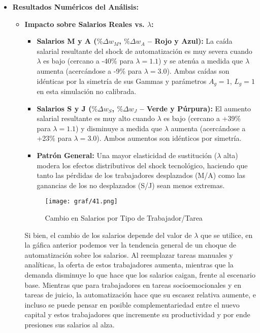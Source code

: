 \documentclass{article}
\theoremstyle{remark}
\theoremstyle{definition}
\begin{document}
\begin{enumerate}
\begin{tcolorbox}[title= Soluci\'on 5]
\begin{itemize}
             \item \textbf{Resultados Numéricos del Análisis:}
                \begin{itemize}
                    \item \textbf{Impacto sobre Salarios Reales vs. \(\lambda\):}                    
                    \begin{itemize}
                        \item \textbf{Salarios M y A ($\%\Delta w_M$, $\%\Delta w_A$ – Rojo y Azul):} La caída salarial resultante del shock de automatizaci\'on es muy severa cuando $\lambda$ es bajo (cercano a -40\% para \(\lambda=1.1\)) y se atenúa a medida que \(\lambda\) aumenta (acercándose a -9\% para \(\lambda=3.0\)). Ambas caídas son idénticas por la simetría de sus Gammas y parámetros \(A_g=1\), \(L_g=1\) en esta simulación no calibrada.
                        \item \textbf{Salarios S y J (\(\%\Delta w_S\), \(\%\Delta w_J\) – Verde y Púrpura):} El aumento salarial resultante es muy alto cuando \(\lambda\) es bajo (cercano a +39\% para \(\lambda=1.1\)) y disminuye a medida que \(\lambda\) aumenta (acercándose a +23\% para \(\lambda=3.0\)). Ambos aumentos son idénticos por simetría.
                        \item \textbf{Patrón General:} Una mayor elasticidad de sustitución (\(\lambda\) alta) modera los efectos distributivos del shock tecnológico, haciendo que tanto las pérdidas de los trabajadores desplazados (M/A) como las ganancias de los no desplazados (S/J) sean menos extremas.
                    \end{itemize}
                    \begin{figure}[H] 
                        \centering
                        \texttt{[image: graf/41.png]}
                        \caption{Cambio en Salarios por Tipo de Trabajador/Tarea}
                        \label{fig:grafsal}
                    \end{figure}

                    Si bien, el cambio de los salarios depende del valor de $\lambda$ que se utilice, en la g\'afica anterior podemos ver la tendencia general de un choque de automatizaci\'on sobre los salarios. Al reemplazar tareas manuales y anal\'iticas, la oferta de estos trabajadores aumenta, mientras que la demanda disminuye lo que hace que los salarios caigan, frente al escenario base. Mientras que para trabajadores en tareas socioemocionales y en tareas de juicio, la automatizaci\'on hace que su escasez relativa aumente, e incluso se puede pensar en posible complementariedad entre el nuevo capital y estos trabajadores que incremente su productividad y por ende presiones sus salarios al alza.
        

\end{itemize}
\end{itemize}
\end{tcolorbox}
\end{enumerate}
\end{document}
